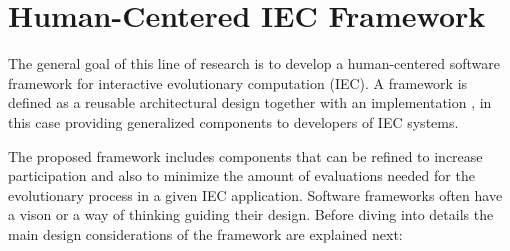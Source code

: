 \section{Human-Centered IEC Framework}
\label{sec:framework}
The general goal of this line of research is to develop a human-centered \cite{gasson2003human} 
software framework for interactive evolutionary computation (IEC). 
A framework is defined as a reusable architectural design together
with an implementation \cite{campbell1991choices}, in this case 
providing generalized components to developers of IEC systems. 

The proposed framework includes components that can be refined to increase
participation and also to minimize the amount of evaluations needed for the evolutionary 
process in a given IEC application. Software frameworks often have a vison or a way 
of thinking \cite{carneiro2010introducing} guiding their
design. Before diving into details the main design considerations of the
framework are explained next:  %



